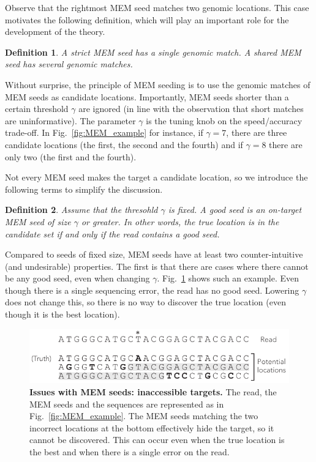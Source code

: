 \documentclass{article}
\newtheorem{definition}{Definition}
\begin{document}
Observe that the rightmost MEM seed matches two genomic locations. This
case motivates the following definition, which will play an important role
for the development of the theory.

\begin{definition}
A \emph{strict} MEM seed has a single genomic match.
A \emph{shared} MEM seed has several genomic matches.
\end{definition}

Without surprise, the principle of MEM seeding is to use the genomic
matches of MEM seeds as candidate locations. Importantly, MEM seeds
shorter than a certain threshold $\gamma$ are ignored (in line with the
observation that short matches are uninformative). The parameter $\gamma$
is the tuning knob on the speed/accuracy trade-off. In
Fig.~\ref{fig:MEM_example} for instance, if $\gamma = 7$, there are three
candidate locations (the first, the second and the fourth) and if $\gamma
= 8$ there are only two (the first and the fourth).

Not every MEM seed makes the target a candidate location, so we introduce
the following terms to simplify the discussion.

\begin{definition}
Assume that the thresohld $\gamma$ is fixed. A \emph{good} seed is an
on-target MEM seed of size $\gamma$ or greater. In other words, the true
location is in the candidate set if and only if the read contains a
good seed.
\end{definition}

Compared to seeds of fixed size, MEM seeds have at least two
counter-intuitive (and undesirable) properties. The first is that there
are cases where there cannot be any good seed, even when changing
$\gamma$. Fig.~\ref{fig:full_masking_example} shows such an example. Even
though there is a single sequencing error, the read has no good seed.
Lowering $\gamma$ does not change this, so there is no way to discover the
true location (even though it is the best location).

\begin{figure}[h]
\centering
\includegraphics[scale=1]{full_masking_example.pdf}
\caption{\textbf{Issues with MEM seeds: inaccessible targets.}
The read, the MEM seeds and the sequences are represented as in
Fig.~\ref{fig:MEM_example}. The MEM seeds matching the two incorrect
locations at the bottom effectively hide the target, so it cannot
be discovered. This can occur even when the true location is the
best and when there is a single error on the read.}
\label{fig:full_masking_example}
\end{figure}
\end{document}
